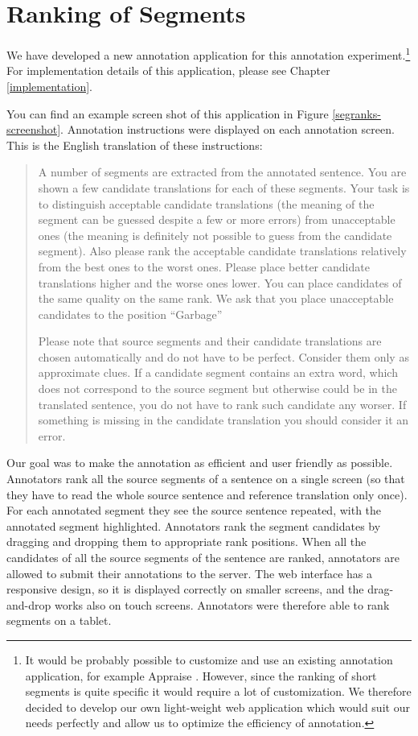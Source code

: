 \section{Ranking of Segments}

We have developed a new annotation application for this annotation
experiment.\footnote{It would be probably possible to customize and use an
  existing annotation application, for example Appraise
  .  However, since the ranking of short segments is
quite specific it would require a lot of customization. We therefore decided to
develop our own light-weight web application which would suit our needs
perfectly and allow us to optimize the efficiency of annotation.} For
implementation details of this application, please see Chapter
\ref{implementation}.

You can find an example screen shot of this application in Figure
\ref{segranks-screenshot}. Annotation instructions were displayed on each
annotation screen. This is the English translation of these instructions:

\begin{quote}

A number of segments are extracted from the annotated sentence. You are shown a
few candidate translations for each of these segments. Your task is to
distinguish acceptable candidate translations (the meaning of the segment can
be guessed despite a few or more errors) from unacceptable ones (the meaning is
definitely not possible to guess from the candidate segment). Also please rank
the acceptable candidate translations relatively from the best ones to the
worst ones.  Please place better candidate translations higher and the worse
ones lower. You can place candidates of the same quality on the same rank.
We ask that you place unacceptable candidates to the position ``Garbage''

Please note that source segments and their candidate translations are chosen
automatically and do not have to be perfect. Consider them only as approximate
clues. If a candidate segment contains an extra word, which does not correspond
to the source segment but otherwise could be in the translated sentence, you do
not have to rank such candidate any worser. If something is missing in the
candidate translation you should consider it an error.

\end{quote}

Our goal was to make the annotation as efficient and user friendly as possible.
Annotators rank all the source segments of a sentence on a single screen (so
that they have to read the whole source sentence and reference translation only
once). For each annotated segment they see the source sentence repeated, with
the annotated segment highlighted. Annotators rank the segment candidates by
dragging and dropping them to appropriate rank positions. When all the
candidates of all the source segments of the sentence are ranked, annotators
are allowed to submit their annotations to the server.  The web interface has a
responsive design, so it is displayed correctly on smaller screens, and the
drag-and-drop works also on touch screens.  Annotators were therefore able to
rank segments on a tablet.


